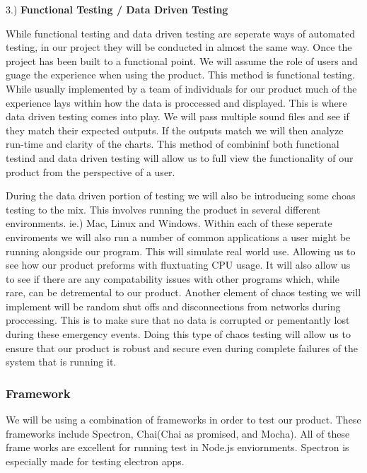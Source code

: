 \vspace{10mm}

3.) \textbf{Functional Testing / Data Driven Testing}
\begin{adjustwidth}{3.5em}{0pt}
  While functional testing and data driven testing are seperate ways of automated testing, in our project they will be conducted in almost the same way. Once the project has been built to a functional point. We will assume the role of users and guage the experience when using the product. This method is functional testing. While usually implemented by a team of individuals for our product much of the experience lays within how the data is proccessed and displayed. This is where data driven testing comes into play. We will pass multiple sound files and see if they match their expected outputs. If the outputs match we will then analyze run-time and clarity of the charts. This method of combininf both functional testind and data driven testing will allow us to full view the functionality of our product from the perspective of a user.
  \par During the data driven portion of testing we will also be introducing some choas testing to the mix. This involves running the product in several different environments. ie.) Mac, Linux and Windows. Within each of these seperate enviroments we will also run a number of common applications a user might be running alongside our program. This will simulate real world use. Allowing us to see how our product preforms with fluxtuating CPU usage. It will also allow us to see if there are any compatability issues with other programs which, while rare, can be detremental to our product. Another element of chaos testing we will implement will be random shut offs and disconnections from networks during proccessing. This is to make sure that no data is corrupted or pementantly lost during these emergency events. Doing this type of chaos testing will allow us to ensure that our product is robust and secure even during complete failures of the system that is running it.
\end{adjustwidth}

\subsubsection{Framework}
  We will be using a combination of frameworks in order to test our product. These frameworks include Spectron, Chai(Chai as promised, and Mocha). All of these frame works are excellent for running test in Node.js enviornments. Spectron is especially made for testing electron apps.\newline

